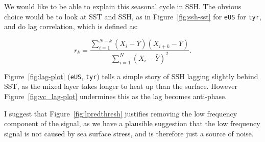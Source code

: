 



\label{sec:lag}



We would like to be able to explain this seasonal cycle in SSH.
The obvious choice would be to look at SST and SSH, as in Figure~\ref{fig:ssh-sst}
for \texttt{eUS} for \texttt{tyr}, and do lag correlation, which is defined as:

\begin{equation}
r_{k}=
\frac{\sum_{i=1}^{N-k}\left(X_{i}
-\bar{Y}\right)\left(X_{i+k}-\bar{Y}\right)}
{\sum_{i=1}^{N}\left(X_{i}
-\bar{Y}\right)^{2}}.
\end{equation}

Figure~\ref{fig:lag-plot} (\texttt{eUS}, \texttt{tyr}) tells a simple story of
SSH lagging slightly behind SST, as the mixed layer takes longer
to heat up than the surface.
However Figure~\ref{fig:vc_lag-plot} undermines this as the
lag becomes anti-phase.

I suggest that Figure~\ref{fig:lpredthresh} justifies removing the low frequency
component of the signal, as we have a plausible suggestion that the
low frequency signal is not caused by sea surface stress, and is therefore
just a source of noise.

\FloatBarrier

